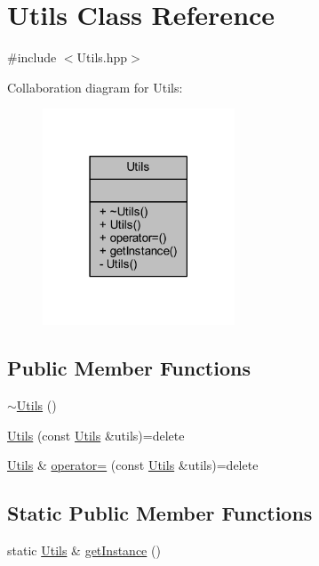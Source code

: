 \hypertarget{class_utils}{\section{Utils Class Reference}
\label{class_utils}
}


{\ttfamily \#include $<$Utils.\-hpp$>$}



Collaboration diagram for Utils\-:
\nopagebreak
\begin{figure}[H]
\begin{center}
\leavevmode
\includegraphics[width=162pt]{class_utils__coll__graph}
\end{center}
\end{figure}
\subsection*{Public Member Functions}
\begin{DoxyCompactItemize}
\item 
\hyperlink{class_utils_afa5e70facffc286607498e7edb639b8a}{$\sim$\-Utils} ()
\item 
\hyperlink{class_utils_a1653aff7c075a5dd590d479d9b62242d}{Utils} (const \hyperlink{class_utils}{Utils} \&utils)=delete
\item 
\hyperlink{class_utils}{Utils} \& \hyperlink{class_utils_add93043cabc33d69f58b083f0e618849}{operator=} (const \hyperlink{class_utils}{Utils} \&utils)=delete
\end{DoxyCompactItemize}
\subsection*{Static Public Member Functions}
\begin{DoxyCompactItemize}
\item 
static \hyperlink{class_utils}{Utils} \& \hyperlink{class_utils_ad50ce773764e9114decc8c415cd38d3e}{get\-Instance} ()
\end{DoxyCompactItemize}

